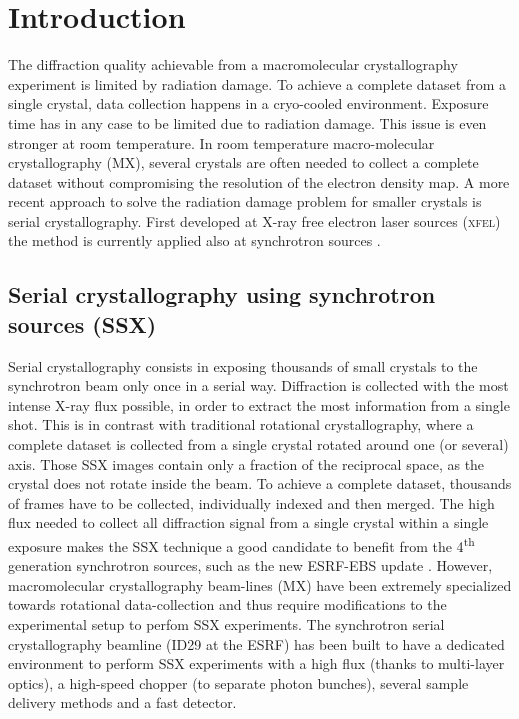 \documentclass[preprint]{iucr}              %
\begin{document}
\section{Introduction}
The diffraction quality achievable from a macromolecular crystallography experiment is limited by radiation damage.
To achieve a complete dataset from a single crystal, data collection happens in a cryo-cooled environment. 
Exposure time has in any case to be limited due to radiation damage. 
This issue is even stronger at room temperature.
In room temperature macro-molecular crystallography (MX), several crystals are often needed to collect a complete dataset without compromising the resolution of the electron density map.
A more recent approach to solve the radiation damage problem for smaller crystals is serial crystallography.
First developed at X-ray free electron laser sources (\textsc{xfel}) \cite{Chapman2011, structure_sx} the method is currently applied also at synchrotron sources  \cite{ssx, ssx_desy, ssx_id13, ssx_diamond}.

\subsection{Serial crystallography using synchrotron sources (SSX)}
%
Serial crystallography consists in exposing thousands of small crystals to the synchrotron beam only once in a serial way.
Diffraction is collected with the most intense X-ray flux possible, in order to extract the most information from a single shot.
This is in contrast with traditional rotational crystallography, where a complete dataset is collected from a single crystal rotated around one (or several) axis. 
Those SSX images contain only a fraction of the reciprocal space, as the crystal does not rotate inside the beam.
To achieve a complete dataset, thousands of frames have to be collected, individually indexed and then merged.
The high flux needed to collect all diffraction signal from a single crystal within a single exposure makes  the SSX technique a good candidate to benefit from the 4\textsuperscript{th} generation synchrotron sources, such as the new ESRF-EBS update \cite{EBS}.
However, macromolecular crystallography beam-lines (MX) have been extremely specialized towards rotational data-collection and thus require modifications to the experimental setup to perfom SSX experiments.
The synchrotron serial crystallography beamline (ID29 at the ESRF) has been built to have a dedicated environment to perform SSX experiments with a high flux (thanks to multi-layer optics), a high-speed chopper (to separate photon bunches), several sample delivery methods and a fast detector.
\end{document}
